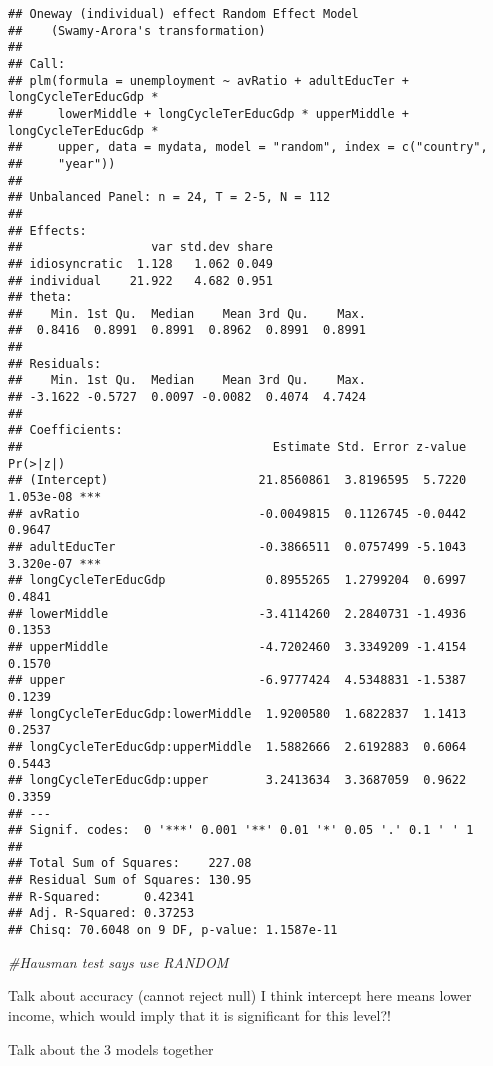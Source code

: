 \documentclass[
]{article}
\newenvironment{Shaded}{\begin{snugshade}}{\end{snugshade}}
\newcommand{\CommentTok}[1]{\textcolor[rgb]{0.56,0.35,0.01}{\textit{#1}}}
\begin{document}
\begin{verbatim}
## Oneway (individual) effect Random Effect Model 
##    (Swamy-Arora's transformation)
## 
## Call:
## plm(formula = unemployment ~ avRatio + adultEducTer + longCycleTerEducGdp * 
##     lowerMiddle + longCycleTerEducGdp * upperMiddle + longCycleTerEducGdp * 
##     upper, data = mydata, model = "random", index = c("country", 
##     "year"))
## 
## Unbalanced Panel: n = 24, T = 2-5, N = 112
## 
## Effects:
##                  var std.dev share
## idiosyncratic  1.128   1.062 0.049
## individual    21.922   4.682 0.951
## theta:
##    Min. 1st Qu.  Median    Mean 3rd Qu.    Max. 
##  0.8416  0.8991  0.8991  0.8962  0.8991  0.8991 
## 
## Residuals:
##    Min. 1st Qu.  Median    Mean 3rd Qu.    Max. 
## -3.1622 -0.5727  0.0097 -0.0082  0.4074  4.7424 
## 
## Coefficients:
##                                   Estimate Std. Error z-value  Pr(>|z|)    
## (Intercept)                     21.8560861  3.8196595  5.7220 1.053e-08 ***
## avRatio                         -0.0049815  0.1126745 -0.0442    0.9647    
## adultEducTer                    -0.3866511  0.0757499 -5.1043 3.320e-07 ***
## longCycleTerEducGdp              0.8955265  1.2799204  0.6997    0.4841    
## lowerMiddle                     -3.4114260  2.2840731 -1.4936    0.1353    
## upperMiddle                     -4.7202460  3.3349209 -1.4154    0.1570    
## upper                           -6.9777424  4.5348831 -1.5387    0.1239    
## longCycleTerEducGdp:lowerMiddle  1.9200580  1.6822837  1.1413    0.2537    
## longCycleTerEducGdp:upperMiddle  1.5882666  2.6192883  0.6064    0.5443    
## longCycleTerEducGdp:upper        3.2413634  3.3687059  0.9622    0.3359    
## ---
## Signif. codes:  0 '***' 0.001 '**' 0.01 '*' 0.05 '.' 0.1 ' ' 1
## 
## Total Sum of Squares:    227.08
## Residual Sum of Squares: 130.95
## R-Squared:      0.42341
## Adj. R-Squared: 0.37253
## Chisq: 70.6048 on 9 DF, p-value: 1.1587e-11
\end{verbatim}

\begin{Shaded}
\begin{Highlighting}[]
\CommentTok{\#Hausman test says use RANDOM}
\end{Highlighting}
\end{Shaded}

Talk about accuracy (cannot reject null) I think intercept here means
lower income, which would imply that it is significant for this level?!

Talk about the 3 models together
\end{document}
